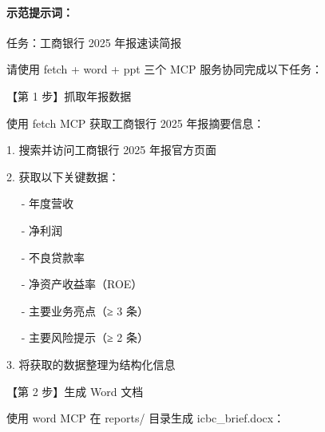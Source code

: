 \documentclass[
  american,
  chinese,
]{ctexart}
\begin{document}
\paragraph{\texorpdfstring{{示范提示词：}\foreignlanguage{american}{}}{示范提示词：}}\label{ux793aux8303ux63d0ux793aux8bcd}

{任务：工商银行}\foreignlanguage{american}{ 2025 }{年报速读简报}\foreignlanguage{american}{}

{请使用}\foreignlanguage{american}{ fetch + word + ppt }{三个}\foreignlanguage{american}{ MCP }{服务协同完成以下任务：}\foreignlanguage{american}{}

{【第}\foreignlanguage{american}{ 1 }{步】抓取年报数据}\foreignlanguage{american}{}

{使用}\foreignlanguage{american}{ fetch MCP }{获取工商银行}\foreignlanguage{american}{ 2025 }{年报摘要信息：}\foreignlanguage{american}{}

\foreignlanguage{american}{1. }{搜索并访问工商银行}\foreignlanguage{american}{ 2025 }{年报官方页面}\foreignlanguage{american}{}

\foreignlanguage{american}{2. }{获取以下关键数据：}\foreignlanguage{american}{}

\foreignlanguage{american}{{~~ }- }{年度营收}\foreignlanguage{american}{}

\foreignlanguage{american}{{~~ }- }{净利润}\foreignlanguage{american}{}

\foreignlanguage{american}{{~~ }- }{不良贷款率}\foreignlanguage{american}{}

\foreignlanguage{american}{{~~ }- }{净资产收益率（}\foreignlanguage{american}{ROE}{）}\foreignlanguage{american}{}

\foreignlanguage{american}{{~~ }- }{主要业务亮点（≥}\foreignlanguage{american}{ 3 }{条）}\foreignlanguage{american}{}

\foreignlanguage{american}{{~~ }- }{主要风险提示（≥}\foreignlanguage{american}{ 2 }{条）}\foreignlanguage{american}{}

\foreignlanguage{american}{3. }{将获取的数据整理为结构化信息}\foreignlanguage{american}{}

\foreignlanguage{american}{【第}\foreignlanguage{american}{ 2 }{\foreignlanguage{american}{步】生成}}\foreignlanguage{american}{ Word }{\foreignlanguage{american}{文档}}\foreignlanguage{american}{}

{\foreignlanguage{american}{使用}}\foreignlanguage{american}{ word MCP }\foreignlanguage{american}{在}\foreignlanguage{american}{ reports/ }{\foreignlanguage{american}{目录生成}}\foreignlanguage{american}{ icbc\_brief.docx}\foreignlanguage{american}{：}\foreignlanguage{american}{}
\end{document}
